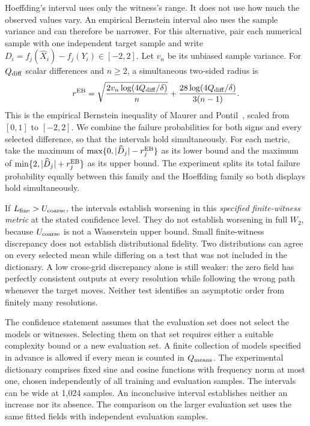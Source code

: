 Hoeffding's interval uses only the witness's range. It does not use how
much the observed values vary. An empirical Bernstein interval also uses
the sample variance and can therefore be narrower. For this alternative,
pair each numerical sample with one independent target sample and write $D_i=f_j(\widehat X_i)-f_j(Y_i)\in[-2,2]$.
Let $v_n$ be its unbiased sample variance. For $Q_{\rm diff}$ scalar
differences and $n\ge2$, a simultaneous two-sided radius is
\begin{equation}
 r^{\rm EB}=\sqrt{\frac{2v_n\log(4Q_{\rm diff}/\delta)}{n}}
     +\frac{28\log(4Q_{\rm diff}/\delta)}{3(n-1)}.
 \label{eq:bernstein-radius}
\end{equation}
This is the empirical Bernstein inequality of Maurer and
Pontil~\citep[Theorem 4]{maurer2009bernstein}, scaled from $[0,1]$ to
$[-2,2]$. We combine the failure probabilities for both signs and every
selected difference, so that the intervals hold simultaneously. For each metric,
take the maximum of $\max\{0,|\widehat D_j|-r_j^{\rm EB}\}$ as its lower
bound and the maximum of $\min\{2,|\widehat D_j|+r_j^{\rm EB}\}$ as its
upper bound. The experiment splits its total failure probability equally between
this family and the Hoeffding family so both displays hold simultaneously.

If $L_{\rm fine}>U_{\rm coarse}$, the intervals establish worsening in
this \emph{specified finite-witness metric} at the stated confidence level.
They do not establish worsening in full $W_2$, because $U_{\rm coarse}$
is not a Wasserstein upper bound.
Small finite-witness discrepancy does not establish distributional fidelity.
Two distributions can agree on every selected mean while differing on a test
that was not included in the dictionary. A low cross-grid discrepancy alone is
still weaker: the zero field has perfectly consistent outputs at every
resolution while following the wrong path whenever the target moves.
Neither test identifies an asymptotic order from finitely many resolutions.

The confidence statement assumes that the evaluation set does not select
the models or witnesses. Selecting them on that set requires either a
suitable complexity bound or a new evaluation set. A finite collection of
models specified in advance is allowed if every mean is counted in
$Q_{\rm means}$. The experimental dictionary comprises fixed sine
and cosine functions with frequency norm at most one, chosen independently
of all training and evaluation samples. The intervals can be wide at 1,024 samples. An inconclusive interval
establishes neither an increase nor its absence. The comparison on the larger evaluation set
uses the same fitted fields with independent evaluation samples.

